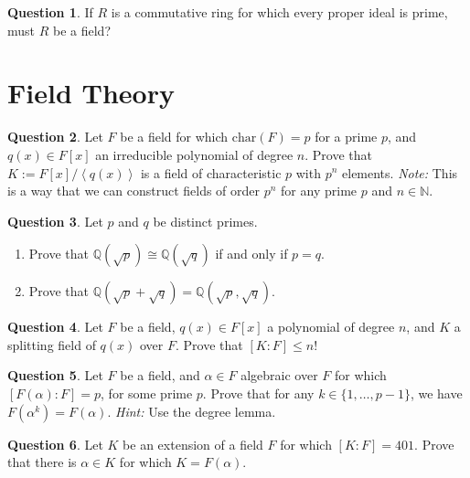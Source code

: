 \documentclass[11pt]{article}
\def\mbb{\mathbb}
\def\Q{\mbb{Q}}
\def\N{\mbb{N}}
\def\Char{\mathrm{char}}
\newcommand{\Ang}[1]{\left\langle #1 \right\rangle}
\theoremstyle{pink}
\theoremstyle{boxedsolution}
\theoremstyle{definition}
\newtheorem{question}{Question}
\theoremstyle{claim}
\begin{document}
\begin{question}
If $R$ is a commutative ring for which every proper ideal is prime, must $R$ be a field?
\end{question}

\section*{Field Theory}

\setcounter{question}{0}

\begin{question}
    Let $F$ be a field for which $\Char(F) = p$ for a prime $p$, and $q(x) \in F[x]$ an irreducible polynomial of degree $n$. Prove that $K := F[x] / \Ang{q(x)}$ is a field of characteristic $p$ with $p^n$ elements. \textit{Note:} This is a way that we can construct fields of order $p^n$ for any prime $p$ and $n \in \N$.
\end{question}

\begin{question}
    Let $p$ and  $q$ be distinct primes.
    \begin{enumerate}[label=(\alph*)]
        \item Prove that $\Q(\sqrt{p}) \cong \Q(\sqrt{q})$ if and only if $p = q$. 

        \item Prove that $\Q(\sqrt{p} + \sqrt{q}) = \Q(\sqrt{p}, \sqrt{q})$.
    \end{enumerate}
\end{question}

\begin{question}
    Let $F$ be a field, $q(x) \in F[x]$ a polynomial of degree $n$, and $K$ a splitting field of $q(x)$ over $F$. Prove that $[K:F] \leq n!$
\end{question}

\begin{question}
    Let $F$ be a field, and $\alpha \in F$ algebraic over $F$ for which $[F(\alpha): F] = p$, for some prime $p$. Prove that for any $k \in \{1, \dots, p-1\}$, we have $F(\alpha^k) = F(\alpha)$. \textit{Hint:} Use the degree lemma.
\end{question}

\begin{question}
    Let $K$ be an extension of a field $F$ for which $[K:F] = 401$. Prove that there is $\alpha \in K$ for which $K = F(\alpha)$.
\end{question}

\end{document}
